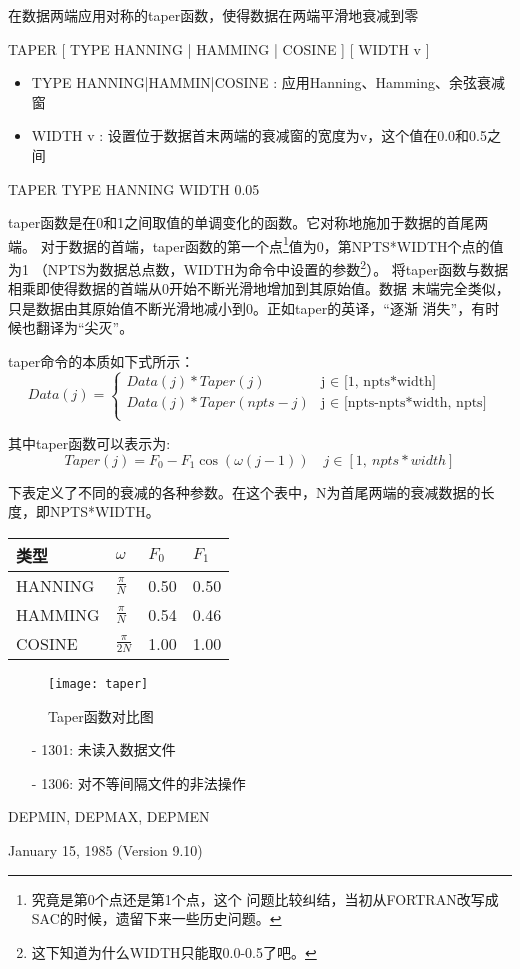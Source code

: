 \label{cmd:taper}

在数据两端应用对称的taper函数，使得数据在两端平滑地衰减到零

TAPER [ TYPE HANNING | HAMMING | COSINE ] [ WIDTH v ]

\begin{itemize}
\item TYPE HANNING|HAMMIN|COSINE : 应用Hanning、Hamming、余弦衰减窗
\item WIDTH v : 设置位于数据首末两端的衰减窗的宽度为v，这个值在0.0和0.5之间
\end{itemize}

TAPER TYPE HANNING WIDTH 0.05

taper函数是在0和1之间取值的单调变化的函数。它对称地施加于数据的首尾两端。
对于数据的首端，taper函数的第一个点\footnote{究竟是第0个点还是第1个点，这个
问题比较纠结，当初从FORTRAN改写成SAC的时候，遗留下来一些历史问题。}值为0，第NPTS*WIDTH个点的值为1
（NPTS为数据总点数，WIDTH为命令中设置的参数\footnote{这下知道为什么WIDTH只能取0.0-0.5了吧。}）。
将taper函数与数据相乘即使得数据的首端从0开始不断光滑地增加到其原始值。数据
末端完全类似，只是数据由其原始值不断光滑地减小到0。正如taper的英译，``逐渐
消失''，有时候也翻译为``尖灭''。

taper命令的本质如下式所示：
\begin{displaymath}
Data(j) = \left\{
		  \begin{array}{ll}
		  Data(j)*Taper(j) & \textrm{j $\in$ [1,\ npts*width]} \\
		  Data(j)*Taper(npts-j) & \textrm{j $\in$ [npts-npts*width,\ npts]} \\
		  \end{array}
\right.
\end{displaymath}

其中taper函数可以表示为:
\[ Taper(j)=F_0 - F_1\cos(\omega(j-1))	\quad j \in [1,\ npts*width] \]

下表定义了不同的衰减的各种参数。在这个表中，N为首尾两端的衰减数据的长度，即NPTS*WIDTH。

\begin{center}
\begin{tabular}{llll}
\toprule
类型 & $\omega$ & $F_0$	& $F_1$	\\
\midrule
HANNING	&	$\frac{\pi}{N}$	&	0.50	&	0.50	\\
HAMMING	&	$\frac{\pi}{N}$	&	0.54	&	0.46	\\
COSINE	&	$\frac{\pi}{2N}$	&	1.00	&	1.00	\\
\bottomrule
\end{tabular}
\end{center}

\begin{figure}[h]
\caption{Taper函数对比图}
\centering
\texttt{[image: taper]}
\end{figure}

\begin{itemize}
\item[-]1301: 未读入数据文件
\item[-]1306: 对不等间隔文件的非法操作
\end{itemize}

DEPMIN, DEPMAX, DEPMEN

January 15, 1985 (Version 9.10)
